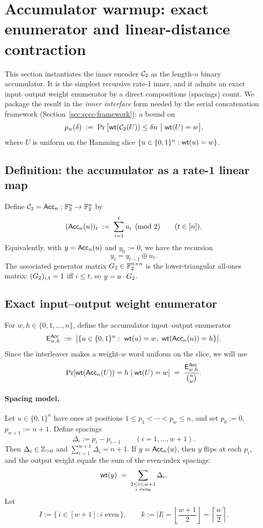 
\section{Accumulator warmup: exact enumerator and linear-distance contraction}
\label{sec:inner-accumulator}

This section instantiates the inner encoder \({\mathcal{C}_2}\) as the length-\(n\) binary accumulator.
It is the simplest recursive rate-1 inner, and it admits an exact input--output weight enumerator by a direct
compositions (spacings) count. We package the result in the \emph{inner interface} form needed by the
serial concatenation framework (Section~\ref{sec:sccc-framework}): a bound on
\[
p_w(\delta) \;:=\; \Pr\big[\mathsf{wt}({\mathcal{C}_2}(U))\le \delta n \ \big|\ \mathsf{wt}(U)=w\big],
\]
where \(U\) is uniform on the Hamming slice \(\{u\in\{0,1\}^n:\mathsf{wt}(u)=w\}\).

\subsection{Definition: the accumulator as a rate-1 linear map}
\label{subsec:acc-def}

Define \({\mathcal{C}_2}=\mathsf{Acc}_n:\mathbb{F}_2^n\to\mathbb{F}_2^n\) by
\[
(\mathsf{Acc}_n(u))_t \;:=\; \sum_{i=1}^t u_i \pmod 2
\qquad (t\in[n]).
\]
Equivalently, with \(y=\mathsf{Acc}_n(u)\) and \(y_0:=0\), we have the recursion
\[
y_t = y_{t-1}\oplus u_t.
\]
The associated generator matrix \({G_2}\in\mathbb{F}_2^{n\times n}\) is the lower-triangular all-ones matrix:
\(({G_2})_{i,t}=1\) iff \(i\le t\), so \(y=u\cdot {G_2}\).

\subsection{Exact input--output weight enumerator}
\label{subsec:acc-enum}

For \(w,h\in\{0,1,\dots,n\}\), define the accumulator input--output enumerator
\[
\mathsf{E}^{\mathsf{Acc}}_{w,h}
\;:=\;
\bigl|\{u\in\{0,1\}^n:\ \mathsf{wt}(u)=w,\ \mathsf{wt}(\mathsf{Acc}_n(u))=h\}\bigr|.
\]
Since the interleaver makes a weight-\(w\) word uniform on the slice, we will use
\[
\Pr[\mathsf{wt}(\mathsf{Acc}_n(U))=h\mid \mathsf{wt}(U)=w] \;=\; \frac{\mathsf{E}^{\mathsf{Acc}}_{w,h}}{\binom{n}{w}}.
\]

\paragraph{Spacing model.}
Let \(u\in\{0,1\}^n\) have ones at positions \(1\le p_1<\cdots<p_w\le n\), and set
\(p_0:=0\), \(p_{w+1}:=n+1\). Define spacings
\[
\Delta_i:=p_i-p_{i-1}\qquad(i=1,\dots,w+1).
\]
Then \(\Delta_i\in\mathbb{Z}_{>0}\) and \(\sum_{i=1}^{w+1}\Delta_i=n+1\).
If \(y=\mathsf{Acc}_n(u)\), then \(y\) flips at each \(p_i\), and the output weight equals the sum of the even-index spacings:
\begin{equation}
\label{eq:acc-weight-even-spacings}
\wt(y) \;=\; \sum_{\substack{2\le i\le w+1\\ i\ \mathrm{even}}}\Delta_i.
\end{equation}
Let
\[
I := \{\,i\in[w+1]: i\text{ even}\,\},
\qquad
k:=|I|=\left\lfloor\frac{w+1}{2}\right\rfloor=\left\lceil\frac{w}{2}\right\rceil.
\]


